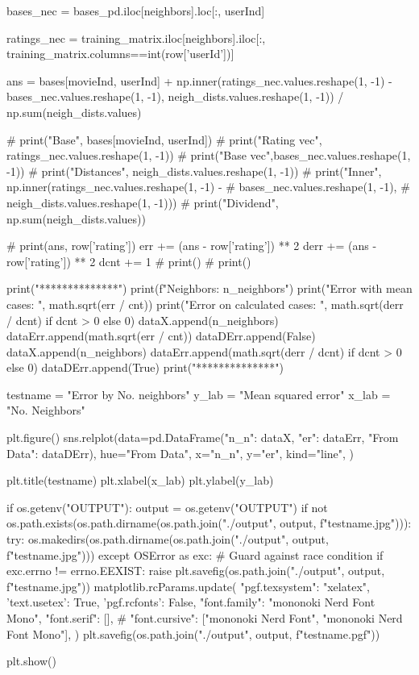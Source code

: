 \begin{latin}
\begin{python}
        bases_nec = bases_pd.iloc[neighbors].loc[:,
                userInd]

        ratings_nec = training_matrix.iloc[neighbors].iloc[:,
                training_matrix.columns==int(row['userId'])]


        ans = bases[movieInd, userInd] + np.inner(ratings_nec.values.reshape(1, -1) -
                bases_nec.values.reshape(1, -1),
                neigh_dists.values.reshape(1, -1)) / np.sum(neigh_dists.values)

        #  print("Base", bases[movieInd, userInd])
        #  print("Rating vec", ratings_nec.values.reshape(1, -1))
        #  print("Base vec",bases_nec.values.reshape(1, -1))
        #  print("Distances", neigh_dists.values.reshape(1, -1))
        #  print("Inner", np.inner(ratings_nec.values.reshape(1, -1) -
        #          bases_nec.values.reshape(1, -1),
        #          neigh_dists.values.reshape(1, -1)))
        #  print("Dividend", np.sum(neigh_dists.values))


        #  print(ans, row['rating'])
        err += (ans - row['rating']) ** 2
        derr += (ans - row['rating']) ** 2
        dcnt += 1
        #  print()
        #  print()

    print("**************")
    print(f"Neighbors: {n_neighbors}")
    print("Error with mean cases: ", math.sqrt(err / cnt))
    print("Error on calculated cases: ", math.sqrt(derr / dcnt) if dcnt > 0 else 0)
    dataX.append(n_neighbors)
    dataErr.append(math.sqrt(err / cnt))
    dataDErr.append(False)
    dataX.append(n_neighbors)
    dataErr.append(math.sqrt(derr / dcnt) if dcnt > 0 else 0)
    dataDErr.append(True)
    print("**************")

testname = "Error by No. neighbors"
y_lab = "Mean squared error"
x_lab = "No. Neighbors"

plt.figure()
sns.relplot(data=pd.DataFrame({"n_n": dataX, "er": dataErr, "From Data": dataDErr}), hue="From Data", x="n_n", y="er", kind="line", )

plt.title(testname)
plt.xlabel(x_lab)
plt.ylabel(y_lab)

if os.getenv("OUTPUT"):
    output = os.getenv("OUTPUT")
    if not os.path.exists(os.path.dirname(os.path.join("./output",
        output, f"{testname}.jpg"))):
        try: os.makedirs(os.path.dirname(os.path.join("./output",
            output, f"{testname}.jpg")))
        except OSError as exc: # Guard against race condition
            if exc.errno != errno.EEXIST:
                raise
    plt.savefig(os.path.join("./output", output, f"{testname}.jpg"))
    matplotlib.rcParams.update({
        "pgf.texsystem": "xelatex",
        'text.usetex': True,
        'pgf.rcfonts': False,
        "font.family": "mononoki Nerd Font Mono",
        "font.serif": [],
        #  "font.cursive": ["mononoki Nerd Font", "mononoki Nerd Font Mono"],
    })
    plt.savefig(os.path.join("./output", output, f"{testname}.pgf"))

plt.show()






  \end{python}
\end{latin}


